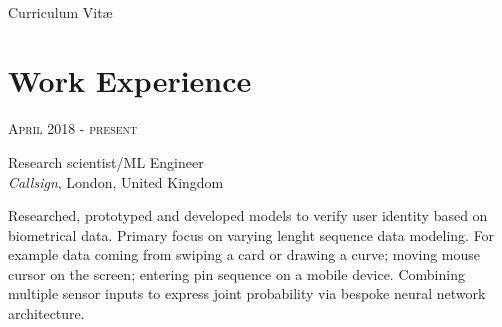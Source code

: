 \documentclass[10pt]{article} %
\begin{document}
\color{text1} %


\par{\\ %
{\color{headings} Curriculum {Vit\ae}\\[15pt]\par} %


\begin{minipage}[t]{0.5\textwidth} %
\vspace{0pt} %


\section{Work Experience}


\vspace{0.5cm}
{\raggedleft\textsc{April 2018 - present}\par}

{\raggedright\large Research scientist/ML Engineer\\
\textit{Callsign}, London, United Kingdom\\[5pt]}

\normalsize{
Researched, prototyped and developed models to verify user identity based on biometrical data. 
Primary focus on varying lenght sequence data modeling. For example data coming from swiping a card or drawing a curve; moving mouse cursor on the screen; entering pin sequence on a mobile device.
Combining multiple sensor inputs to express joint probability via bespoke neural network architecture.
\\

}
\end{minipage}}
\end{document}
